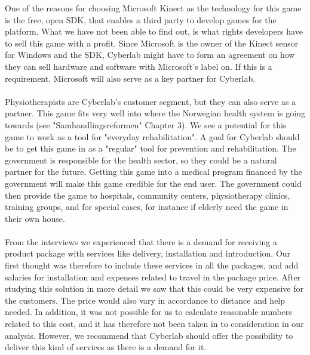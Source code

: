 One of the reasons for choosing Microsoft Kinect as the technology for this game is the free, open SDK, that enables a third party to develop games for the platform. What we have not been able to find out, is what rights developers have to sell this game with a profit. Since Microsoft is the owner of the Kinect sensor for Windows and the SDK, Cyberlab might have to form an agreement on how they can sell hardware and software with Microsoft's label on. If this is a requirement, Microsoft will also serve as a key partner for Cyberlab. \\ \\
Physiotherapists are Cyberlab's customer segment, but they can also serve as a partner. This game fits very well into where the Norwegian health system is going towards (see "Samhandlingsreformen" Chapter 3). We see a potential for this game to work as a tool for "everyday rehabilitation". A goal for Cyberlab should be to get this game in as a "regular" tool for prevention and rehabilitation. The government is responsible for the health sector, so they could be a natural partner for the future.  Getting this game into a medical program financed by the government will make this game credible for the end user. The government could then provide the game to hospitals, community centers, physiotherapy clinics, training groups, and for special cases, for instance if elderly need the game in their own house. \\ \\ 
From the interviews we experienced that there is a demand for receiving a product package with services like delivery, installation and introduction. Our first thought was therefore to include these services in all the packages, and add salaries for installation and expenses related to travel in the package price. After studying this solution in more detail we saw that this could be very expensive for the customers. The price would also vary in accordance to distance and help needed. In addition, it was not possible for us to calculate reasonable numbers related to this cost, and it has therefore not been taken in to consideration in our analysis. However, we recommend that Cyberlab should offer the possibility to deliver this kind of services as there is a demand for it. \\ \\   
